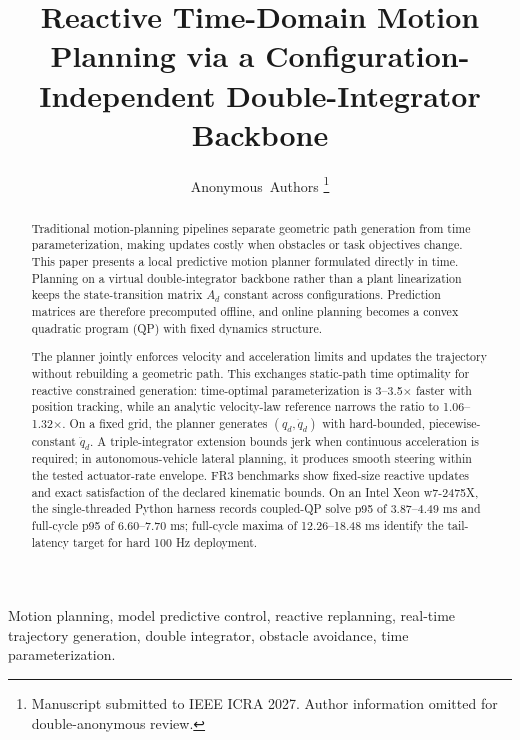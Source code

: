 \documentclass[conference]{IEEEtran}
\begin{document}
\title{Reactive Time-Domain Motion Planning via a Configuration-Independent Double-Integrator Backbone}

\author{Anonymous~Authors%
\thanks{Manuscript submitted to IEEE ICRA 2027. Author information omitted for double-anonymous review.}%
}

\maketitle
\thispagestyle{empty}
\pagestyle{empty}

\begin{abstract}
Traditional motion-planning pipelines separate geometric path generation
from time parameterization, making updates costly when obstacles or task
objectives change. This paper presents a local predictive motion planner
formulated directly in time. Planning on a virtual double-integrator
backbone rather than a plant linearization keeps the state-transition matrix
$A_d$ constant across configurations. Prediction matrices are therefore
precomputed offline, and online planning becomes a convex quadratic program
(QP) with fixed dynamics structure.

The planner jointly enforces velocity and acceleration limits and updates the
trajectory without rebuilding a geometric path. This exchanges static-path
time optimality for reactive constrained generation: time-optimal
parameterization is 3--3.5$\times$ faster with position tracking, while an
analytic velocity-law reference narrows the ratio to 1.06--1.32$\times$.
On a fixed grid, the planner generates $(q_d,\dot q_d)$ with hard-bounded,
piecewise-constant $\ddot q_d$. A triple-integrator extension bounds jerk when
continuous acceleration is required; in autonomous-vehicle lateral planning,
it produces smooth steering within the tested actuator-rate envelope. FR3
benchmarks show fixed-size reactive updates and exact satisfaction of the
declared kinematic bounds. On an Intel Xeon w7-2475X, the single-threaded
Python harness records coupled-QP solve p95 of 3.87--4.49 ms and full-cycle p95
of 6.60--7.70 ms; full-cycle maxima of 12.26--18.48 ms identify the
tail-latency target for hard 100 Hz deployment.
\end{abstract}

\begin{IEEEkeywords}
Motion planning, model predictive control, reactive replanning, real-time trajectory generation, double integrator,
obstacle avoidance, time parameterization.
\end{IEEEkeywords}



\end{document}
